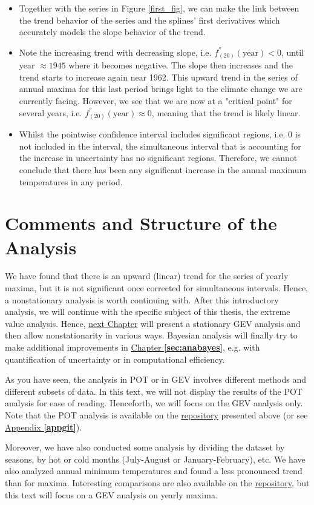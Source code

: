 \begin{itemize}
\item Together with the series in Figure \ref{first_fig}, we can make the link between the trend behavior of the series and the splines' first derivatives which accurately models the slope behavior of the trend. 
\item Note the increasing trend with decreasing slope, i.e. $ f_{(20)}^{''}(\text{year})<0$, until year $\approx 1945$ where it becomes negative. The slope then increases and the trend starts to increase again near 1962. This upward trend in the series of annual maxima for this last period brings light to the climate change we are currently facing. However, we see that we are now at a "critical point" for several years, i.e. $f_{(20)}^{''}(\text{year})\approx 0$, meaning that the trend is likely linear. 

\item  Whilst the pointwise confidence interval includes significant regions, i.e. 0 is not included in the interval, the simultaneous interval that is accounting for the increase in uncertainty has no significant regions. Therefore, we cannot conclude that there has been any significant increase in the annual maximum temperatures in any period.

\end{itemize}


\section{Comments and Structure of the Analysis }

 We have found that there is an upward (linear) trend for the series of yearly maxima, but it is not significant once corrected for simultaneous intervals.
Hence, a nonstationary analysis is worth continuing with.
After this introductory analysis, we will continue with the specific subject of this thesis, the extreme value analysis. Hence, \hyperref[sec:anagev]{next Chapter} will present a stationary GEV analysis and then allow nonstationarity in various ways. Bayesian analysis will finally try to make additional improvements in \hyperref[sec:anabayes]{Chapter \textbf{\ref{sec:anabayes}}}, e.g. with quantification of uncertainty or in computational efficiency.


As you have seen, the analysis in POT or in GEV involves different methods and different subsets of data. In this text, we will not display the results of the POT analysis for ease of reading. Henceforth, we will focus on the GEV analysis only. Note that the POT analysis is available on the \href{https://github.com/proto4426/PissoortThesis}{repository} presented above (or see
\hyperref[appgit]{Appendix\textbf{ \ref{appgit}}}).


Moreover, we have also conducted some analysis by dividing the dataset by seasons, by hot or cold months (July-August or January-February), etc. We have also analyzed annual minimum temperatures and found a less pronounced trend than for maxima.
Interesting comparisons are also available on the \href{https://github.com/proto4426/PissoortThesis}{repository}, but this text will focus on a GEV analysis on yearly maxima.